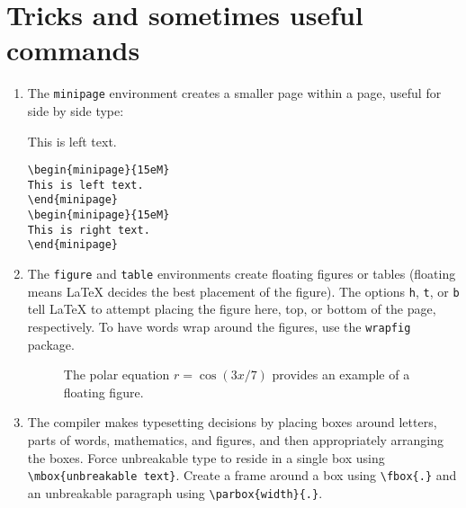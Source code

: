 \documentclass[12pt]{paper}
\begin{document}
\section{Tricks and sometimes useful commands}

\begin{enumerate}

\item The \verb~minipage~ environment creates a smaller page within a page,
  useful for side by side type:
\begin{center}
\begin{minipage}{15eM}
This is left text.
\end{minipage}
\begin{minipage}{15eM}
\begin{lstlisting}
\begin{minipage}{15eM}
This is left text.
\end{minipage}
\begin{minipage}{15eM}
This is right text.
\end{minipage}
\end{lstlisting}
\end{minipage}
\end{center}

\item The \verb~figure~ and \verb~table~ environments create floating figures or
tables (floating means \LaTeX{} decides the best placement of the figure).  The options 
\verb~h~, \verb~t~, or \verb~b~ tell \LaTeX{} to attempt placing the figure here, top, or bottom
of the page, respectively.  To have words wrap around the figures, use the \verb~wrapfig~ package.
\begin{figure}[h]
\begin{center}
\end{center}
\caption{The polar equation $r = \cos(3 x/7)$ provides an example of a floating figure.}
\end{figure}

\item The compiler makes typesetting decisions by placing boxes around letters, parts of 
words, mathematics, and figures, and then appropriately arranging the boxes.  Force unbreakable type
to reside in a single box using \verb~\mbox{unbreakable text}~.  Create a frame around a box 
using \verb~\fbox{.}~ and an unbreakable paragraph using \verb~\parbox{width}{.}~.  


\end{enumerate}
\end{document}
